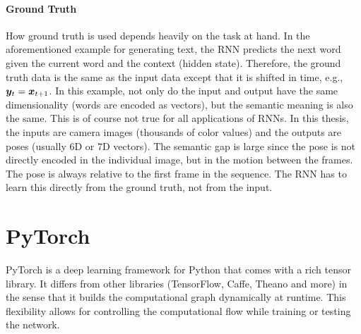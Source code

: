 		\paragraph{Ground Truth}
		How ground truth is used depends heavily on the task at hand.
		In the aforementioned example for generating text, the RNN predicts the next word given the current word and the context (hidden state).
		Therefore, the ground truth data is the same as the input data except that it is shifted in time, e.g., $\bm{y}_t = \bm{x}_{t + 1}$.
		In this example, not only do the input and output have the same dimensionality (words are encoded as vectors), but the semantic meaning is also the same.
		This is of course not true for all applications of RNNs.
		In this thesis, the inputs are camera images (thousands of color values) and the outputs are poses (usually 6D or 7D vectors).
		The semantic gap is large since the pose is not directly encoded in the individual image, but in the motion between the frames.
		The pose is always relative to the first frame in the sequence.
		The RNN has to learn this directly from the ground truth, not from the input.
		
		
		
	\section{PyTorch}
		PyTorch is a deep learning framework for Python that comes with a rich tensor library.
		It differs from other libraries (TensorFlow, Caffe, Theano and more) in the sense that it builds the computational graph dynamically at runtime.
		This flexibility allows for controlling the computational flow while training or testing the network.